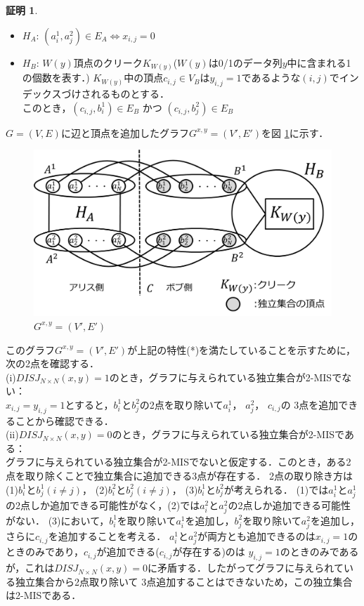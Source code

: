 \documentclass[12pt]{thesis}
\theoremstyle{definition}
\newtheorem*{prf*}{証明}
\begin{document}
\begin{prf*}
\newpage
\begin{itemize}
\item $H_{A}$: $(a_{i}^{1}, a_{j}^{2}) \in E_{A} \Leftrightarrow x_{i, j} = 0$
\item $H_{B}$: $W(y)$頂点のクリーク$K_{W(y)}$($W(y)$は0/1のデータ列$y$中に含まれる1の個数を表す．)
$K_{W(y)}$中の頂点$c_{i, j} \in V_{B}$は$y_{i, j} = 1$であるような$(i, j)$でインデックスづけされるものとする． \\
このとき，$(c_{i, j}, b_{i}^{1}) \in E_{B}$ かつ $(c_{i, j}, b_{j}^{2}) \in E_{B}$
\end{itemize}

$G = (V, E)$に辺と頂点を追加したグラフ$G^{x, y} = (V', E')$を図 \ref{2_G(x,y)}に示す．

\begin{figure}[ht]
\begin{center}
\includegraphics[width=120mm]{2_Gxy.png}
\end{center}
\caption{$G^{x, y} = (V', E')$}
\label{2_G(x,y)}
\end{figure}

このグラフ$G^{x, y} = (V', E')$が上記の特性(*)を満たしていることを示すために，次の2点を確認する． \\
(i)$DISJ_{N \times N} (x, y) = 1$のとき，グラフに与えられている独立集合が2-MISでない： \\
$x_{i, j} = y_{i, j} =1$とすると，$b_{i}^{1}$と$b_{j}^{2}$の2点を取り除いて$a_{i}^{1}$， $a_{j}^{2}$， $c_{i, j}$の
3点を追加できることから確認できる． \\
(ii)$DISJ_{N \times N} (x, y) = 0$のとき，グラフに与えられている独立集合が2-MISである： \\ 
グラフに与えられている独立集合が2-MISでないと仮定する．このとき，ある2点を取り除くことで独立集合に追加できる3点が存在する．
2点の取り除き方は(1)$b_{i}^{1}$と$b_{j}^{1}(i \neq j)$， (2)$b_{i}^{2}$と$b_{j}^{2}(i \neq j)$， (3)$b_{i}^{1}$と$b_{j}^{2}$が考えられる．
(1)では$a_{i}^{1}$と$a_{j}^{1}$の2点しか追加できる可能性がなく，(2)では$a_{i}^{2}$と$a_{j}^{2}$の2点しか追加できる可能性がない．
(3)において，$b_{i}^{1}$を取り除いて$a_{i}^{1}$を追加し，$b_{j}^{2}$を取り除いて$a_{j}^{2}$を追加し，さらに$c_{i, j}$を追加することを考える．
$a_{i}^{1}$と$a_{j}^{2}$が両方とも追加できるのは$x_{i, j} = 1$のときのみであり，$c_{i, j}$が追加できる($c_{i, j}$が存在する)のは
$y_{i, j} = 1$のときのみであるが，これは$DISJ_{N \times N} (x, y) = 0$に矛盾する．したがってグラフに与えられている独立集合から2点取り除いて
3点追加することはできないため，この独立集合は2-MISである．


\end{prf*}
\end{document}
